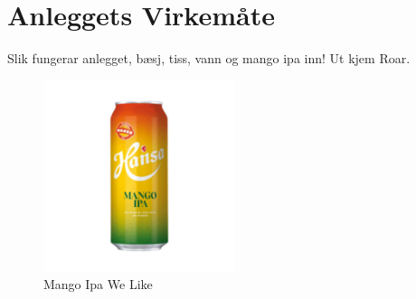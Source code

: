 \chapter{Anleggets Virkemåte}
\thispagestyle{fancy}
Slik fungerar anlegget, bæsj, tiss, vann og mango ipa inn! Ut kjem Roar.

\begin{figure}[htbp]
    \centering
    \includegraphics[width=0.5\textwidth]{Bilder/mango.jpg}
    \caption{Mango Ipa We Like}\label{fig:Mango-Lopo}
\end{figure}
    